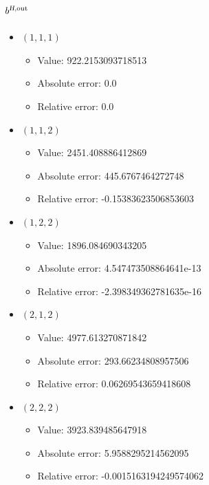 \documentclass{article}%
\begin{document}
\subsection{$b^{\textsl{H},\text{out}}$}%
\begin{itemize}%
	\item $(1, 1, 1)$%
	\begin{itemize}%
		\item Value: 922.2153093718513%
		\item Absolute error: 0.0%
		\item Relative error: 0.0%
	\end{itemize}%
	\item $(1, 1, 2)$%
	\begin{itemize}%
		\item Value: 2451.408886412869%
		\item Absolute error: 445.6767464272748%
		\item Relative error: -0.15383623506853603%
	\end{itemize}%
	\item $(1, 2, 2)$%
	\begin{itemize}%
		\item Value: 1896.084690343205%
		\item Absolute error: 4.547473508864641e-13%
		\item Relative error: -2.398349362781635e-16%
	\end{itemize}%
	\item $(2, 1, 2)$%
	\begin{itemize}%
		\item Value: 4977.613270871842%
		\item Absolute error: 293.66234808957506%
		\item Relative error: 0.06269543659418608%
	\end{itemize}%
	\item $(2, 2, 2)$%
	\begin{itemize}%
		\item Value: 3923.839485647918%
		\item Absolute error: 5.9588295214562095%
		\item Relative error: -0.0015163194249574062%
	\end{itemize}%
\end{itemize}%
\end{document}
